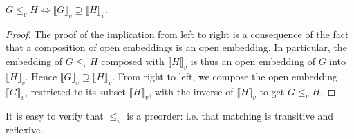\documentclass[runningheads]{llncs}
\newcommand{\tensor}{\otimes}
\newcommand{\vinterp}[1]{\llbracket #1 \rrbracket_v}
\begin{document}
\begin{proposition}
\label{match-interp-thm}
$G \leq_v H \Leftrightarrow \vinterp{G} \supseteq \vinterp{H}$.
\end{proposition}
\begin{proof}
  The proof of the implication from left to right is a consequence of
  the fact that a composition of open embeddings is an open embedding.
  In particular, the embedding of $G \leq_v H$ composed with
  $\vinterp{H}$ is thus an open embedding of $G$ into $\vinterp{H}$.
  Hence $\vinterp{G} \supseteq \vinterp{H}$. From right to left, we
  compose the open embedding $\vinterp{G}$, restricted to its subset
  $\vinterp{H}$, with the inverse of $\vinterp{H}$ to get $G \leq_v
  H$.
\end{proof}

It is easy to verify that $\leq_v$ is a preorder: i.e. that
matching is transitive and reflexive.




\end{document}

